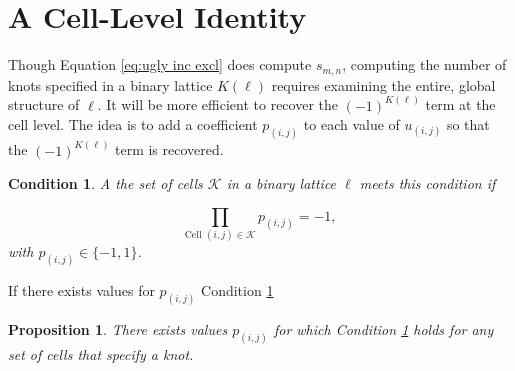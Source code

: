 \documentclass[12pt]{article}
\theoremstyle{plain}
\newtheorem{prop}[thm]{Proposition}
\newtheorem{condition}[thm]{Condition}
\theoremstyle{definition}
\theoremstyle{remark}
\theoremstyle{definition}
\begin{document}
\section{A Cell-Level Identity}

Though Equation \ref{eq:ugly inc excl} does compute $s_{m,n}$, computing the number of knots specified in a binary lattice $K(\ell)$ requires examining the entire, global structure of $\ell$. It will be more efficient to recover the $(-1)^{K(\ell)}$ term at the cell level. The idea is to add a coefficient $p_{(i,j)}$ to each value of $u_{(i,j)}$ so that the $(-1)^{K(\ell)}$ term is recovered.

\begin{condition}
    A the set of cells $\mathcal{K}$ in a binary lattice $\ell$ meets this condition if
    
    \begin{equation}
        \prod_{\text{Cell } (i,j) \in \mathcal{K}} p_{(i,j)} = -1,
        \label{eq:neg prod knot condition}
    \end{equation}
    with $p_{(i,j)} \in \{-1,1\}$.
    \label{cond:neg prod condition}
\end{condition}

If there exists values for $p_{(i,j)}$ Condition \ref{cond:neg prod condition}

\begin{prop}
    There exists values $p_{(i,j)}$ for which Condition \ref{cond:neg prod condition} holds for any set of cells that specify a knot.
    \label{prop:neg prod prop}
\end{prop}
\end{document}
